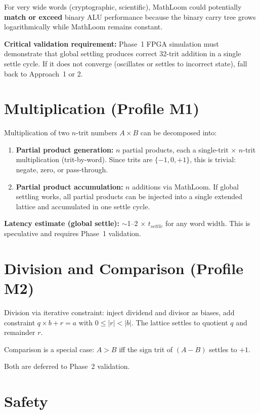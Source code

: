 \documentclass[11pt, a4paper]{report}
\begin{document}
For very wide words (cryptographic, scientific), MathLoom could
potentially \textbf{match or exceed} binary ALU performance because the
binary carry tree grows logarithmically while MathLoom remains constant.

\textbf{Critical validation requirement:} Phase~1 FPGA simulation must
demonstrate that global settling produces correct 32-trit addition in a
single settle cycle. If it does not converge (oscillates or settles to
incorrect state), fall back to Approach~1 or 2.

\section{Multiplication (Profile M1)}

Multiplication of two $n$-trit numbers $A \times B$ can be decomposed
into:
\begin{enumerate}[nosep]
  \item \textbf{Partial product generation:} $n$ partial products, each
        a single-trit $\times$ $n$-trit multiplication (trit-by-word).
        Since trits are $\{-1, 0, +1\}$, this is trivial: negate, zero,
        or pass-through.
  \item \textbf{Partial product accumulation:} $n$ additions via MathLoom.
        If global settling works, all partial products can be injected
        into a single extended lattice and accumulated in one settle cycle.
\end{enumerate}

\textbf{Latency estimate (global settle):} $\sim$1--2 $\times$ $t_{settle}$
for any word width. This is speculative and requires Phase~1 validation.

\section{Division and Comparison (Profile M2)}

Division via iterative constraint: inject dividend and divisor as biases,
add constraint $q \times b + r = a$ with $0 \leq |r| < |b|$. The lattice
settles to quotient $q$ and remainder $r$.

Comparison is a special case: $A > B$ iff the sign trit of $(A - B)$
settles to $+1$.

Both are deferred to Phase~2 validation.

\section{Safety}
\end{document}
